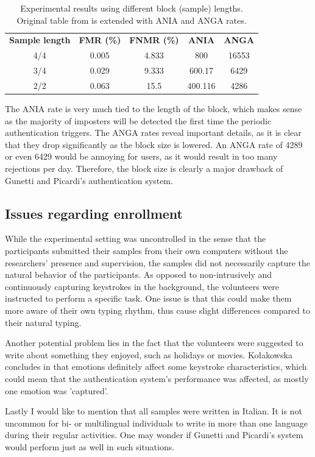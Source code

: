 \documentclass[informationsecurity]{gucmasterproject}
\begin{document}
\begin{table}[h]
\centering
\begin{tabular}{ccccc}
 \bf Sample length & \bf FMR (\%) & \bf FNMR (\%) & \bf ANIA & \bf ANGA \\
 4/4 & 0.005 & 4.833 & 800 & 16553 \\
 3/4 & 0.029 & 9.333 & 600.17 & 6429\\
 2/2 & 0.063 & 15.5 & 400.116 & 4286
\end{tabular}
\caption{Experimental results using different block (sample) lengths. Original table from \cite{gnp} is extended with ANIA and ANGA rates.}
\label{tab:gnp-blocksizes}
\end{table}
The ANIA rate is very much tied to the length of the block, which makes sense as the majority of imposters will be detected the first time the periodic authentication triggers.
The ANGA rates reveal important details, as it is clear that they drop significantly as the block size is lowered.
An ANGA rate of 4289 or even 6429 would be annoying for users, as it would result in too many rejections per day.
Therefore, the block size is clearly a major drawback of Gunetti and Picardi's authentication system.

\subsection{Issues regarding enrollment}
While the experimental setting was uncontrolled in the sense that the participants submitted their samples from their own computers without the researchers' presence and supervision, the samples did not necessarily capture the natural behavior of the participants.
As opposed to non-intrusively and continuously capturing keystrokes in the background, the volunteers were instructed to perform a specific task.
One issue is that this could make them more aware of their own typing rhythm, thus cause slight differences compared to their natural typing.

Another potential problem lies in the fact that the volunteers were suggested to write about something they enjoyed, such as holidays or movies.
Kołakowska concludes in \cite{emotion} that emotions definitely affect some keystroke characteristics, which could mean that the authentication system's performance was affected, as mostly one emotion was 'captured'.

Lastly I would like to mention that all samples were written in Italian.
It is not uncommon for bi- or multilingual individuals to write in more than one language during their regular activities.
One may wonder if Gunetti and Picardi's system would perform just as well in such situations.
\end{document}
